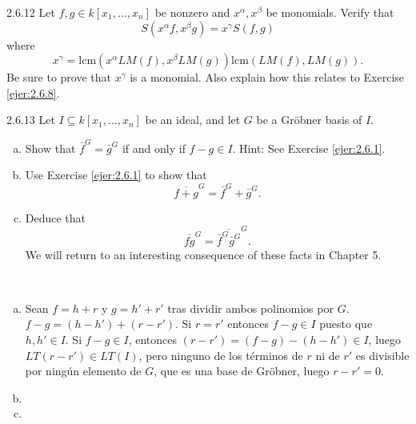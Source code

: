 \documentclass[twoside]{article}
\begin{document}
\newpage

\begin{ejercicio}{2.6.12}
Let $f , g ∈ k[x_1,\dots , x_n]$ be nonzero and $x^α, x^β$ be monomials. Verify that
$$S(x^αf , x^βg) = x^γS( f , g)$$
where
$$x^γ =
\mathrm{lcm}(x^αLM( f ), x^βLM(g))
\mathrm{lcm}(LM( f ), LM(g))
.$$
Be sure to prove that $x^{γ}$ is a monomial. Also explain how this relates to Exercise \ref{ejer:2.6.8}.
\end{ejercicio}
\begin{solucion}

\end{solucion}

\newpage

\begin{ejercicio}{2.6.13}
Let $I ⊆ k[x_1,\dots , x_n]$ be an ideal, and let $G$ be a Gröbner basis of $I$.
\begin{enumerate}[a.]
\item Show that $\bar{f}^G = \bar{g}^G$ if and only if $f − g ∈ I$. Hint: See Exercise \ref{ejer:2.6.1}.
\item Use Exercise \ref{ejer:2.6.1} to show that
$$\overline{f + g}^G = \bar{f}^G + \bar{g}^G.$$
\item Deduce that
$$\overline{fg}^G = \overline{\bar{f}^G  \bar{g}^G}^G
.$$
We will return to an interesting consequence of these facts in Chapter 5.
\end{enumerate}
\end{ejercicio}
\begin{solucion}\
\begin{enumerate}[a.]
\item Sean $f=h+r$ y $g=h'+r'$ tras dividir ambos polinomios por $G$. $f-g=(h-h')+(r-r')$. Si $r=r'$ entonces $f-g\in I$ puesto que $h,h'\in I$. Si $f-g\in I$, entonces $(r-r')=(f-g)-(h-h')\in I$, luego $LT(r-r')\in LT(I)$, pero ninguno de los términos de $r$ ni de $r'$ es divisible por ningún elemento de $G$, que es una base de Gröbner, luego $r-r'=0$. 
\item
\item
\end{enumerate}
\end{solucion}
\end{document}
